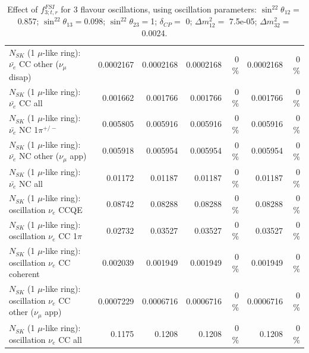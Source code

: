 \begin{table}
\begin{tabular}{| l | r | r | r  r | r  r |}
          $N_{SK}$ (1 $\mu$-like ring): $\bar{\nu_e}$ CC other ($\nu_\mu$ disap) &       0.0002167 &       0.0002168 &       0.0002168 &        0 \%  &       0.0002168 &        0 \%  \\ 
                            $N_{SK}$ (1 $\mu$-like ring): $\bar{\nu_{e}}$ CC all &        0.001662 &        0.001766 &        0.001766 &        0 \%  &        0.001766 &        0 \%  \\ 
\hline
                     $N_{SK}$ (1 $\mu$-like ring): $\bar{\nu_e}$ NC 1$\pi^{+/-}$ &        0.005805 &        0.005916 &        0.005916 &        0 \%  &        0.005916 &        0 \%  \\ 
            $N_{SK}$ (1 $\mu$-like ring): $\bar{\nu_e}$ NC other ($\nu_\mu$ app) &        0.005918 &        0.005954 &        0.005954 &        0 \%  &        0.005954 &        0 \%  \\ 
                            $N_{SK}$ (1 $\mu$-like ring): $\bar{\nu_{e}}$ NC all &         0.01172 &         0.01187 &         0.01187 &        0 \%  &         0.01187 &        0 \%  \\ 
\hline
\hline
\hline
                          $N_{SK}$ (1 $\mu$-like ring): oscillation $\nu_e$ CCQE &         0.08742 &         0.08288 &         0.08288 &        0 \%  &         0.08288 &        0 \%  \\ 
                     $N_{SK}$ (1 $\mu$-like ring): oscillation $\nu_e$ CC 1$\pi$ &         0.02732 &         0.03527 &         0.03527 &        0 \%  &         0.03527 &        0 \%  \\ 
                   $N_{SK}$ (1 $\mu$-like ring): oscillation $\nu_e$ CC coherent &        0.002039 &        0.001949 &        0.001949 &        0 \%  &        0.001949 &        0 \%  \\ 
      $N_{SK}$ (1 $\mu$-like ring): oscillation $\nu_e$ CC other ($\nu_\mu$ app) &       0.0007229 &       0.0006716 &       0.0006716 &        0 \%  &       0.0006716 &        0 \%  \\ 
                       $N_{SK}$ (1 $\mu$-like ring): oscillation $\nu_e$  CC all &          0.1175 &          0.1208 &          0.1208 &        0 \%  &          0.1208 &        0 \%  \\ 
\hline
\hline
\end{tabular}
\caption{ Effect of $f_{3; t, r}^{FSI}$ for 3 flavour oscillations, using oscillation parameters:  $\sin^22\theta_{12} = $0.857; $\sin^22\theta_{13} = $0.098; $\sin^22\theta_{23} = $1; $\delta_{CP} = $        0; $\Delta m^2_{12} = $    7.5e-05; $\Delta m^2_{32} = $    0.0024. }
\label{tab:num_fsi_003_1RmuT_3f_osc_t13:0.098_spectralreco_spectraltrue}
\end{table}
